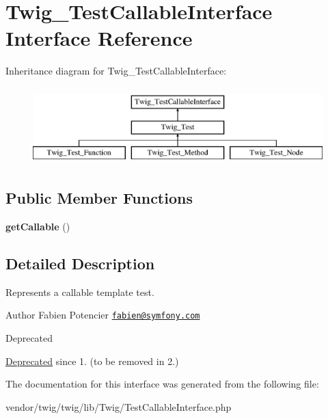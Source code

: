 \hypertarget{interfaceTwig__TestCallableInterface}{}\section{Twig\+\_\+\+Test\+Callable\+Interface Interface Reference}
\label{interfaceTwig__TestCallableInterface}
Inheritance diagram for Twig\+\_\+\+Test\+Callable\+Interface\+:\begin{figure}[H]
\begin{center}
\leavevmode
\includegraphics[height=3.000000cm]{interfaceTwig__TestCallableInterface}
\end{center}
\end{figure}
\subsection*{Public Member Functions}
\begin{DoxyCompactItemize}
\item 
{\bfseries get\+Callable} ()\hypertarget{interfaceTwig__TestCallableInterface_a1692aeff4e5737e41c9fb6581a39f0ca}{}\label{interfaceTwig__TestCallableInterface_a1692aeff4e5737e41c9fb6581a39f0ca}

\end{DoxyCompactItemize}


\subsection{Detailed Description}
Represents a callable template test.

\begin{DoxyAuthor}{Author}
Fabien Potencier \href{mailto:fabien@symfony.com}{\tt fabien@symfony.\+com}
\end{DoxyAuthor}
\begin{DoxyRefDesc}{Deprecated}
\item[\hyperlink{deprecated__deprecated000041}{Deprecated}]since 1. (to be removed in 2.) \end{DoxyRefDesc}


The documentation for this interface was generated from the following file\+:\begin{DoxyCompactItemize}
\item 
vendor/twig/twig/lib/\+Twig/Test\+Callable\+Interface.\+php\end{DoxyCompactItemize}
